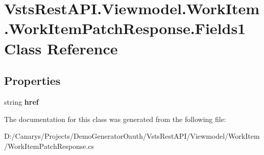 \hypertarget{class_vsts_rest_a_p_i_1_1_viewmodel_1_1_work_item_1_1_work_item_patch_response_1_1_fields1}{}\section{Vsts\+Rest\+A\+P\+I.\+Viewmodel.\+Work\+Item.\+Work\+Item\+Patch\+Response.\+Fields1 Class Reference}
\label{class_vsts_rest_a_p_i_1_1_viewmodel_1_1_work_item_1_1_work_item_patch_response_1_1_fields1}
\subsection*{Properties}
\begin{DoxyCompactItemize}
\item 
\mbox{\label{class_vsts_rest_a_p_i_1_1_viewmodel_1_1_work_item_1_1_work_item_patch_response_1_1_fields1_ac2e34f6d54fc718a6063e858c73adee0}} 
string {\bfseries href}
\end{DoxyCompactItemize}


The documentation for this class was generated from the following file\+:\begin{DoxyCompactItemize}
\item 
D\+:/\+Canarys/\+Projects/\+Demo\+Generator\+Oauth/\+Vsts\+Rest\+A\+P\+I/\+Viewmodel/\+Work\+Item/Work\+Item\+Patch\+Response.\+cs\end{DoxyCompactItemize}
